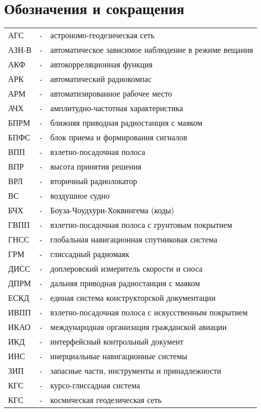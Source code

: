 \chapter*{Обозначения и сокращения}
\label{cha:acro}

\begin{longtable}{lll}
АГС  & - & астрономо-геодезическая сеть \\ 
АЗН-В& - & автоматическое зависимое наблюдение в режиме вещания \\ 
АКФ  & - & автокорреляционная функция \\ 
АРК  & - & автоматический радиокомпас \\ 
АРМ  & - & автоматизированное рабочее место \\ 
АЧХ  & - & амплитудно-частотная характеристика \\ 
БПРМ & - & ближняя приводная радиостанция с маяком \\ 
БПФС & - & блок приема и формирования сигналов \\ 
ВПП  & - & взлетно-посадочная полоса \\ 
ВПР  & - & высота принятия решения \\ 
ВРЛ  & - & вторичный радиолокатор \\ 
ВС   & - & воздушное судно \\ 
БЧХ  & - & Боуза-Чоудхури-Хоквингема (коды) \\ 
ГВПП & - & взлетно-посадочная полоса с грунтовым покрытием \\ 
ГНСС & - & глобальная навигационная спутниковая система \\ 
ГРМ  & - & глиссадный радиомаяк \\ 
ДИСС & - & доплеровский измеритель скорости и сноса \\ 
ДПРМ & - & дальняя приводная радиостанция с маяком \\ 
ЕСКД & - & единая система конструкторской документации \\ 
ИВПП & - & взлетно-посадочная полоса с искусственным покрытием \\ 
ИКАО & - & международная организация гражданской авиации \\ 
ИКД  & - & интерфейсный контрольный документ \\ 
ИНС  & - & инерциальные навигационные системы \\ 
ЗИП  & - & запасные части, инструменты и принадлежности \\ 
КГС  & - & курсо-глиссадная система \\ 
КГС  & - & космическая геодезическая сеть \\ 

\end{longtable}
